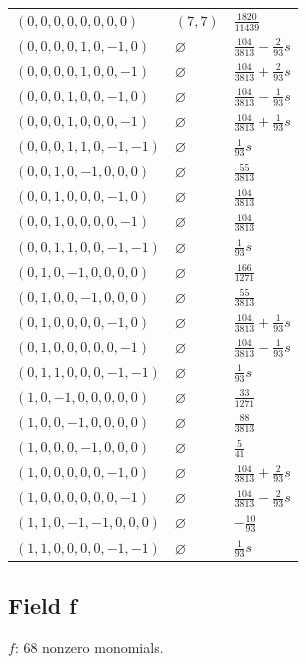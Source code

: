 \begin{longtable}{@{}lll@{}}
$(0,0,0,0,0,0,0,0)$ & $(7,7)$ & $\frac{1820}{11439}$\\
$(0,0,0,0,1,0,-1,0)$ & $\varnothing$ & $\frac{104}{3813}-\frac{2}{93}s$\\
$(0,0,0,0,1,0,0,-1)$ & $\varnothing$ & $\frac{104}{3813}+\frac{2}{93}s$\\
$(0,0,0,1,0,0,-1,0)$ & $\varnothing$ & $\frac{104}{3813}-\frac{1}{93}s$\\
$(0,0,0,1,0,0,0,-1)$ & $\varnothing$ & $\frac{104}{3813}+\frac{1}{93}s$\\
$(0,0,0,1,1,0,-1,-1)$ & $\varnothing$ & $\frac{1}{93}s$\\
$(0,0,1,0,-1,0,0,0)$ & $\varnothing$ & $\frac{55}{3813}$\\
$(0,0,1,0,0,0,-1,0)$ & $\varnothing$ & $\frac{104}{3813}$\\
$(0,0,1,0,0,0,0,-1)$ & $\varnothing$ & $\frac{104}{3813}$\\
$(0,0,1,1,0,0,-1,-1)$ & $\varnothing$ & $\frac{1}{93}s$\\
$(0,1,0,-1,0,0,0,0)$ & $\varnothing$ & $\frac{166}{1271}$\\
$(0,1,0,0,-1,0,0,0)$ & $\varnothing$ & $\frac{55}{3813}$\\
$(0,1,0,0,0,0,-1,0)$ & $\varnothing$ & $\frac{104}{3813}+\frac{1}{93}s$\\
$(0,1,0,0,0,0,0,-1)$ & $\varnothing$ & $\frac{104}{3813}-\frac{1}{93}s$\\
$(0,1,1,0,0,0,-1,-1)$ & $\varnothing$ & $\frac{1}{93}s$\\
$(1,0,-1,0,0,0,0,0)$ & $\varnothing$ & $\frac{33}{1271}$\\
$(1,0,0,-1,0,0,0,0)$ & $\varnothing$ & $\frac{88}{3813}$\\
$(1,0,0,0,-1,0,0,0)$ & $\varnothing$ & $\frac{5}{41}$\\
$(1,0,0,0,0,0,-1,0)$ & $\varnothing$ & $\frac{104}{3813}+\frac{2}{93}s$\\
$(1,0,0,0,0,0,0,-1)$ & $\varnothing$ & $\frac{104}{3813}-\frac{2}{93}s$\\
$(1,1,0,-1,-1,0,0,0)$ & $\varnothing$ & $-\frac{10}{93}$\\
$(1,1,0,0,0,0,-1,-1)$ & $\varnothing$ & $\frac{1}{93}s$\\
\end{longtable}
\endgroup

\subsection{Field f}
$f$: 68 nonzero monomials.

